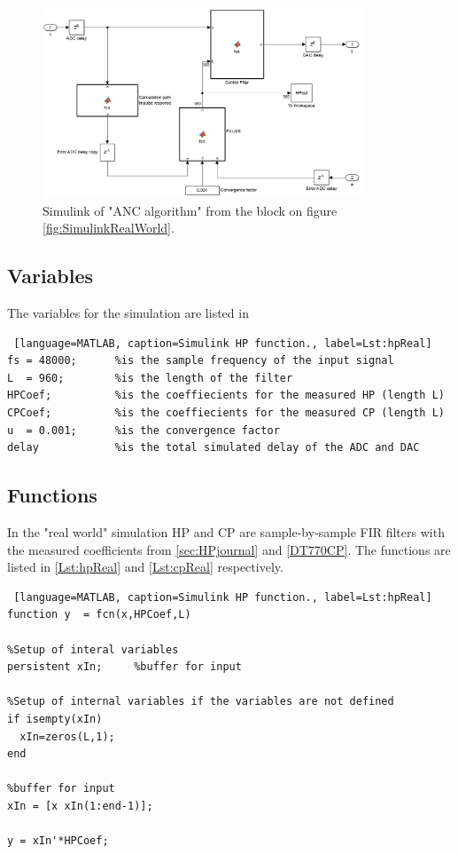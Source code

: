 \begin{figure}[H]
	\centering
	\includegraphics[width=0.85\textwidth]{figures/BasicSystem/SimulinkANC}
	\caption{Simulink of "ANC algorithm" from the block on figure \ref{fig:SimulinkRealWorld}.}
	\label{fig:SimulinkANC}
\end{figure} 

\subsection{Variables}
The variables for the simulation are listed in 
\begin{lstlisting} [language=MATLAB, caption=Simulink HP function., label=Lst:hpReal]
fs = 48000; 	 %is the sample frequency of the input signal
L  = 960;  	 	 %is the length of the filter
HPCoef;  		 %is the coeffiecients for the measured HP (length L)
CPCoef;  		 %is the coeffiecients for the measured CP (length L)
u  = 0.001;		 %is the convergence factor
delay 			 %is the total simulated delay of the ADC and DAC 
\end{lstlisting}

\subsection{Functions}
In the "real world" simulation HP and CP are sample-by-sample FIR filters with the measured coefficients from \autoref{sec:HPjournal} and  \autoref{DT770CP}. The functions are listed in \autoref{Lst:hpReal} and  \autoref{Lst:cpReal} respectively. 

\begin{lstlisting} [language=MATLAB, caption=Simulink HP function., label=Lst:hpReal]
function y  = fcn(x,HPCoef,L)

%Setup of interal variables
persistent xIn;     %buffer for input

%Setup of internal variables if the variables are not defined
if isempty(xIn)
  xIn=zeros(L,1);
end

%buffer for input
xIn = [x xIn(1:end-1)];

y = xIn'*HPCoef;
\end{lstlisting}

